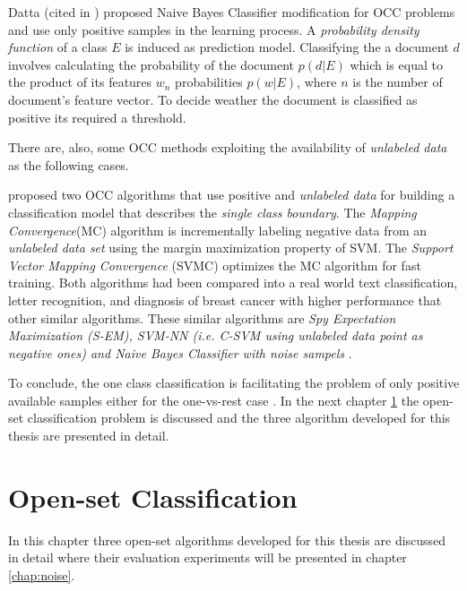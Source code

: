Datta (cited in \parencite{manevitz2002one}) proposed Naive Bayes Classifier modification for OCC problems and use only positive samples in the learning process. A \textit{probability density function} of a class $E$ is induced as prediction model. Classifying the a document $d$ involves calculating the probability of the document $p(d|E)$ which is equal to the product of its features $w_{n}$ probabilities $p(w|E)$, where $n$ is the number of document's feature vector. To decide weather the document is classified as positive its required a threshold. 

There are, also, some OCC methods exploiting the availability of \textit{unlabeled data} as the following cases. 

\parencite{yu2005single} proposed two OCC algorithms that use positive and \textit{unlabeled data} for building a classification model that describes the \textit{single class boundary}. The \textit{Mapping Convergence}(MC) algorithm is incrementally labeling negative data from an \textit{unlabeled data set} using the margin maximization property of SVM. The \textit{Support Vector Mapping Convergence} (SVMC) optimizes the MC algorithm for fast training. Both algorithms had been compared into a real world text classification, letter recognition, and diagnosis of breast cancer with higher performance that other similar algorithms. These similar algorithms are \textit{Spy Expectation Maximization (S-EM), SVM-NN (i.e. C-SVM using unlabeled data point as negative ones) and Naive Bayes Classifier with noise sampels} \parencite{liu2002partially, li2003learning}.

To conclude, the one class classification is facilitating the problem of only positive available samples either for the one-vs-rest case \parencite{khan2010survey,manevitz2002one,yu2005single,scholkopf1999estimating,li2003learning}. In the next chapter \ref{chap:openset:sec:Openset_Class_Classification} the open-set classification problem is discussed and the three algorithm developed for this thesis are presented in detail.



\section{Open-set Classification}\label{chap:openset:sec:Openset_Class_Classification}

In this chapter three open-set algorithms developed for this thesis are discussed in detail where their evaluation experiments will be presented in chapter \ref{chap:noise}. 


